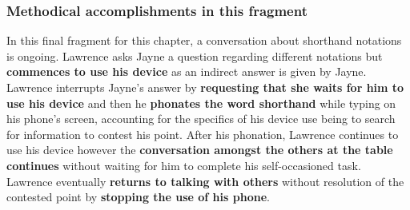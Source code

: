 


\subsubsection{Methodical accomplishments in this fragment}\label{sec:empirical pub findings contest methods}
\begin{revisedsubmission}
In this final fragment for this chapter, a conversation about shorthand notations is ongoing.
Lawrence asks Jayne a question regarding different notations but \textbf{commences to use his device} as an indirect answer is given by Jayne.
Lawrence interrupts Jayne's answer by \textbf{requesting that she waits for him to use his device} and then he \textbf{phonates the word shorthand} while typing on his phone's screen, accounting for the specifics of his device use being to search for information to contest his point.
After his phonation, Lawrence continues to use his device however the \textbf{conversation amongst the others at the table continues} without waiting for him to complete his self-occasioned task.
Lawrence eventually \textbf{returns to talking with others} without resolution of the contested point by \textbf{stopping the use of his phone}.
\end{revisedsubmission}






